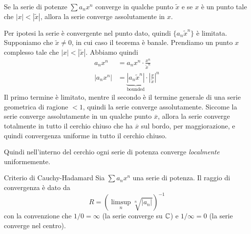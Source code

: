 \documentclass[a4paper]{article}
\begin{document}
\begin{snippetproposition}{}
    Se la serie di potenze \(\sum a_nx^n\) converge in qualche punto \(\tilde x\)
    e se \(x\) è un punto tale che \(|x| < |\tilde x|\),
    allora la serie converge assolutamente in \(x\).
\end{snippetproposition}

\begin{snippetproof}{}
    Per ipotesi la serie è convergente nel punto dato, quindi
    \(\{a_n \tilde x^n\}\) è limitata.
    Supponiamo che \(\tilde x \neq 0\), in cui caso il teorema è banale.
    Prendiamo un punto \(x\) complesso tale che \(|x| < |\tilde x|\).
    Abbiamo quindi
    \begin{align*}
        a_n x^n &= a_n x^n \cdot \frac{
            x^n
        }{
            \tilde x^n
        } \\
        |a_n x^n| &= \underbrace{|a_n \tilde x^n|}_{\text{bounded}} \cdot \left|\frac{
            x
        }{
            \tilde x
        }\right|^n
    \end{align*}
    Il primo termine è limitato, mentre il secondo è il termine generale di una serie geometrica di ragione
    \(<1\), quindi la serie converge assolutamente.
    Siccome la serie converge assolutamente in un qualche punto \(\overline x\),
    allora la serie converge totalmente in tutto il cerchio chiuso che ha \(\overline x\)
    sul bordo, per maggiorazione, e quindi convergenza uniforme in tutto il cerchio chiuso.
\end{snippetproof}

Quindi nell'interno del cerchio ogni serie di potenza converge \emph{localmente} uniformemente.

\begin{snippettheorem}{Criterio di Cauchy-Hadamard}
    Sia \(\sum a_n x^n\) una serie di potenza.
    Il raggio di convergenza è dato da
    \[
        R = \left(
            \limsup_n \sqrt[n]{|a_n|}
        \right)^{-1}
    \]
    con la convenzione che \(1/0 = \infty\) (la serie converge su \(\mathbb{C}\))
    e \(1/\infty = 0\) (la serie converge nel centro).
\end{snippettheorem}
\end{document}
